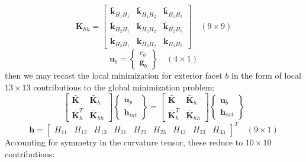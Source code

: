 \documentclass[11pt]{article} %
\begin{document}
\begin{equation}
	\bar{\mathbf{K}}_{hh} = \left[ \begin{array}{ccc} \bar{\mathbf{k}}_{H_1H_1} & \bar{\mathbf{k}}_{H_1H_2} & \bar{\mathbf{k}}_{H_1H_3} \\ \bar{\mathbf{k}}_{H_2H_1} & \bar{\mathbf{k}}_{H_2H_2} & \bar{\mathbf{k}}_{H_2H_3} \\ \bar{\mathbf{k}}_{H_3H_1} & \bar{\mathbf{k}}_{H_3H_2} & \bar{\mathbf{k}}_{H_3H_3} \end{array} \right] \quad (9 \times 9)
\end{equation}
\begin{equation}
	\mathbf{u}_b = \left\{ \begin{array}{c} c_b \\ \mathbf{g}_b \end{array} \right\} \quad (4 \times 1)
\end{equation}
then we may recast the local minimization for exterior facet $b$ in the form of local $13\times13$ contributions to the global minimization problem:
\begin{equation}
	\left[ \begin{array}{cc} \bar{\mathbf{K}} & \bar{\mathbf{K}}_{h} \\ \bar{\mathbf{K}}^T_{h} & \bar{\mathbf{K}}_{hh} \end{array} \right] \left\{ \begin{array}{c} \mathbf{u}_p \\ \mathbf{h}_{int} \end{array} \right\} = \left[ \begin{array}{cc} \bar{\mathbf{K}} & \bar{\mathbf{K}}_{h} \\ \bar{\mathbf{K}}^T_{h} & \bar{\mathbf{K}}_{hh} \end{array} \right] \left\{ \begin{array}{c} \mathbf{u}_b \\ \mathbf{h}_{ext} \end{array} \right\}
\end{equation}
\begin{equation}
	\mathbf{h} =  \left[ \begin{array}{ccccccccc} H_{11} & H_{12} & H_{13} & H_{21} & H_{22} & H_{23} & H_{13} & H_{23} & H_{33} \end{array} \right]^T \quad (9 \times 1)
\end{equation}
Accounting for symmetry in the curvature tensor, these reduce to $10\times10$ contributions:
\end{document}
